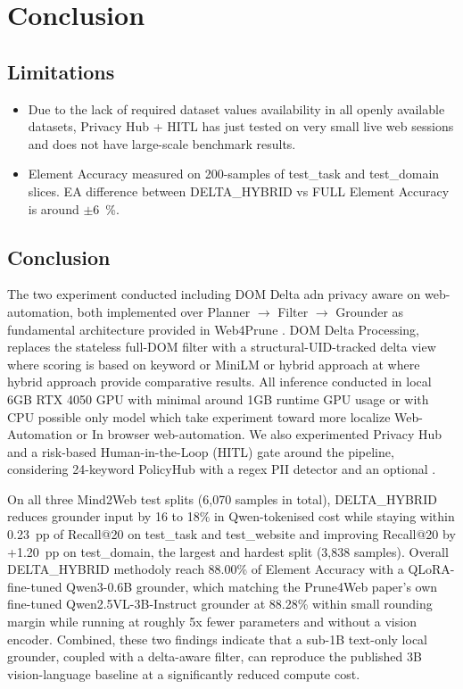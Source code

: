 \chapter{Conclusion}

\section{Limitations}

\begin{itemize}
    \item Due to the lack of required dataset values availability in all openly available datasets, Privacy Hub + HITL has just tested on very small live web sessions and does not have large-scale benchmark results.
    \item Element Accuracy measured on 200-samples of test\_task and test\_domain slices. EA difference between DELTA\_HYBRID vs FULL Element Accuracy is around $\pm$6~\%.
\end{itemize}

\section{Conclusion}
The two experiment conducted including DOM Delta adn privacy aware on web-automation, both implemented over Planner $\to$ Filter $\to$ Grounder as fundamental architecture provided in Web4Prune \cite{zhang2025prune4web}. DOM Delta Processing, replaces the stateless full-DOM filter with a structural-UID-tracked delta view where scoring is based on keyword or MiniLM \cite{wang2020minilm} or hybrid approach at where hybrid approach provide comparative results. All inference conducted in local 6GB RTX 4050 GPU with minimal around 1GB runtime GPU usage or with CPU possible only model which take experiment toward more localize Web-Automation or In browser web-automation. We also experimented Privacy Hub and a risk-based Human-in-the-Loop (HITL) gate around the pipeline, considering 24-keyword PolicyHub with a regex PII detector and an optional \cite{dettmers2023qlora}.

On all three Mind2Web \cite{deng2023mind2webgeneralistagentweb} test splits (6,070 samples in total), DELTA\_HYBRID reduces grounder input by 16 to 18\% in Qwen-tokenised cost while staying within 0.23~pp of Recall@20 on test\_task and test\_website and improving Recall@20 by +1.20~pp on test\_domain, the largest and hardest split (3,838 samples). Overall DELTA\_HYBRID methodoly reach 88.00\% of Element Accuracy with a QLoRA-fine-tuned Qwen3-0.6B grounder, which matching the Prune4Web paper's own fine-tuned Qwen2.5VL-3B-Instruct grounder at 88.28\% within small rounding margin while running at roughly 5x fewer parameters and without a vision encoder. Combined, these two findings indicate that a sub-1B text-only local grounder, coupled with a delta-aware filter, can reproduce the published 3B vision-language baseline at a significantly reduced compute cost.

